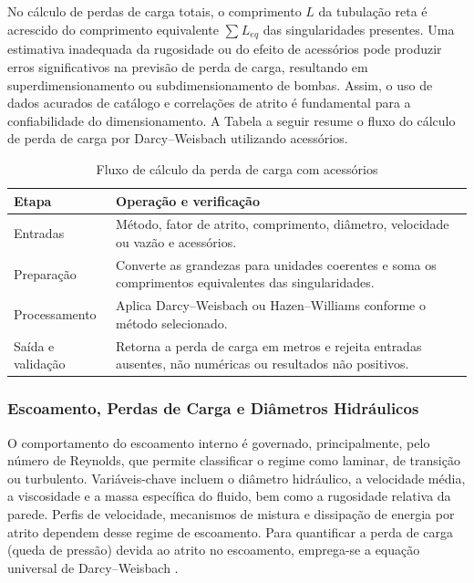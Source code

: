 No cálculo de perdas de carga totais, o comprimento $L$ da tubulação reta é acrescido do comprimento equivalente $\sum_{}^{} L_{eq}$ das singularidades presentes. Uma estimativa inadequada da rugosidade ou do efeito de acessórios pode produzir erros significativos na previsão de perda de carga, resultando em superdimensionamento ou subdimensionamento de bombas. Assim, o uso de dados acurados de catálogo e correlações de atrito é fundamental para a confiabilidade do dimensionamento. A Tabela a seguir resume o fluxo do cálculo de perda de carga por Darcy--Weisbach utilizando acessórios.

\begin{table}[H]
    \centering
    \caption{Fluxo de cálculo da perda de carga com acessórios}
    \label{tab:fluxo-perda-carga-acessorios}
    \small
    \begin{tabular}{p{}p{}}
        \hline
        \textbf{Etapa} & \textbf{Operação e verificação} \\
        \hline
        Entradas & Método, fator de atrito, comprimento, diâmetro, velocidade ou vazão e acessórios. \\
        Preparação & Converte as grandezas para unidades coerentes e soma os comprimentos equivalentes das singularidades. \\
        Processamento & Aplica Darcy--Weisbach ou Hazen--Williams conforme o método selecionado. \\
        Saída e validação & Retorna a perda de carga em metros e rejeita entradas ausentes, não numéricas ou resultados não positivos. \\
        \hline
    \end{tabular}
\end{table}


\subsubsection{Escoamento, Perdas de Carga e Diâmetros Hidráulicos}

O comportamento do escoamento interno é governado, principalmente, pelo número de Reynolds, que permite classificar o regime como laminar, de transição ou turbulento. Variáveis-chave incluem o diâmetro hidráulico, a velocidade média, a viscosidade e a massa específica do fluido, bem como a rugosidade relativa da parede. Perfis de velocidade, mecanismos de mistura e dissipação de energia por atrito dependem desse regime de escoamento. Para quantificar a perda de carga (queda de pressão) devida ao atrito no escoamento, emprega-se a equação universal de Darcy–Weisbach \cite{white2018}.

